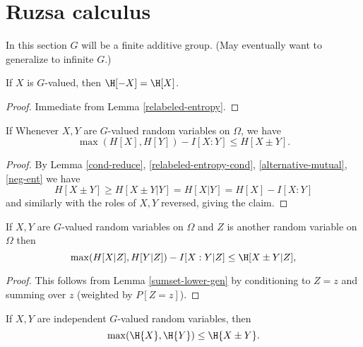 \chapter{Ruzsa calculus}

In this section $G$ will be a finite additive group.  (May eventually want to generalize to infinite $G$.)

\begin{lemma}\label{neg-ent}  If $X$ is $G$-valued, then $\H[-X]=\H[X]$.
\end{lemma}

\begin{proof} Immediate from Lemma \ref{relabeled-entropy}.
\end{proof}

\begin{lemma}\label{sumset-lower-gen}  If
Whenever $X,Y$ are $G$-valued random variables on $\Omega$, we have
$$ \max(H[X], H[Y]) - I[X:Y] \leq H[X \pm Y].$$
\end{lemma}

\begin{proof}  By Lemma \ref{cond-reduce}, \ref{relabeled-entropy-cond}, \ref{alternative-mutual}, \ref{neg-ent} we have
$$
 H[X\pm Y] \geq H[X\pm Y|Y] = H[X|Y]= H[X] - I[X:Y]
$$
and similarly with the roles of $X,Y$ reversed, giving the claim.
\end{proof}

\begin{corollary}\label{sumset-lower-gen-cond} If $X,Y$ are $G$-valued random variables on $\Omega$ and $Z$ is another random variable on $\Omega$ then
\[
  \max(H[X|Z], H[Y|Z]) - I[X:Y|Z] \leq \H[X\pm Y|Z],
\]
\end{corollary}

\begin{proof} This follows from Lemma \ref{sumset-lower-gen} by conditioning to $Z = z$ and summing over $z$ (weighted by $P[Z=z]$).
\end{proof}

\begin{corollary}\label{sumset-lower} If $X,Y$ are independent $G$-valued random variables, then
$$\max(\H{X}, \H{Y}) \leq \H{X\pm Y}.
$$
\end{corollary}

